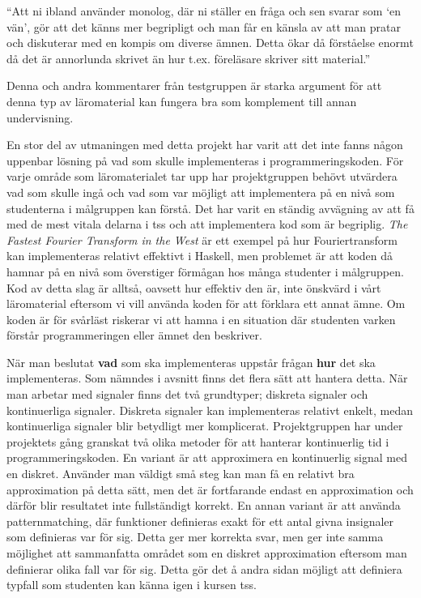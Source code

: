 \documentclass[12pt,a4paper,twoside,openright]{article}
\begin{document}
\begin{displayquote}
  ``Att ni ibland använder monolog, där ni ställer en fråga och sen
  svarar som `en vän', gör att det känns mer begripligt och man får en
  känsla av att man pratar och diskuterar med en kompis om diverse
  ämnen. Detta ökar då förståelse enormt då det är annorlunda skrivet än
  hur t.ex. föreläsare skriver sitt material.''
\end{displayquote}

Denna och andra kommentarer från testgruppen är starka argument för
att denna typ av läromaterial kan fungera bra som komplement till
annan undervisning.

En stor del av utmaningen med detta projekt har varit att det inte
fanns någon uppenbar lösning på vad som skulle implementeras i
programmeringskoden. För varje område som läromaterialet tar upp har
projektgruppen behövt utvärdera vad som skulle ingå och vad som var
möjligt att implementera på en nivå som studenterna i målgruppen kan
förstå. Det har varit en ständig avvägning av att få med de mest
vitala delarna i \gls{tss} och att implementera kod som är
begriplig. \textit{The Fastest Fourier Transform in the West}
\cite{fastestfourier} är ett exempel på hur Fouriertransform kan
implementeras relativt effektivt i Haskell, men problemet är att koden
då hamnar på en nivå som överstiger förmågan hos många studenter i
målgruppen. Kod av detta slag är alltså, oavsett hur effektiv den är,
inte önskvärd i vårt läromaterial eftersom vi vill använda koden för
att förklara ett annat ämne. Om koden är för svårläst riskerar vi att
hamna i en situation där studenten varken förstår programmeringen
eller ämnet den beskriver.

När man beslutat \textbf{vad} som ska implementeras uppstår frågan
\textbf{hur} det ska implementeras. Som nämndes i avsnitt
 finns det flera sätt att hantera detta. När
man arbetar med signaler finns det två grundtyper; diskreta signaler
och kontinuerliga signaler. Diskreta signaler kan implementeras
relativt enkelt, medan kontinuerliga signaler blir betydligt mer
komplicerat. Projektgruppen har under projektets gång granskat två
olika metoder för att hanterar kontinuerlig tid i
programmeringskoden. En variant är att approximera en kontinuerlig
signal med en diskret. Använder man väldigt små steg kan man få en
relativt bra approximation på detta sätt, men det är fortfarande
endast en approximation och därför blir resultatet inte fullständigt
korrekt.
En annan variant är att använda \gls{patternmatching}, där funktioner
definieras exakt för ett antal givna insignaler som definieras var för
sig. Detta ger mer korrekta svar, men ger inte samma möjlighet att
sammanfatta
området som en diskret approximation eftersom man definierar olika
fall var för sig. Detta gör det å andra sidan möjligt att definiera
typfall som studenten kan känna igen i kursen \gls{tss}.
\end{document}
